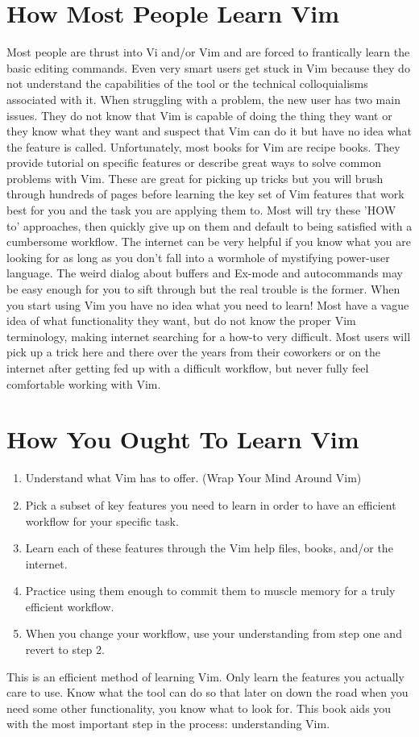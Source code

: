 \documentclass[12pt, oneside]{book}
\begin{document}
\section{How Most People Learn Vim}
Most people are thrust into Vi and/or Vim and are forced to frantically learn the basic editing commands.  Even very smart users get stuck in Vim because they do not understand the capabilities of the tool or the technical colloquialisms associated with it.  When struggling with a problem, the new user has two main issues.  They do not know that Vim is capable of doing the thing they want or they know what they want and suspect that Vim can do it but have no idea what the feature is called.  Unfortunately, most books for Vim are recipe books.  They provide tutorial on specific features or describe great ways to solve common problems with Vim.  These are great for picking up tricks but you will brush through hundreds of pages before learning the key set of Vim features that work best for you and the task you are applying them to.  Most will try these 'HOW to' approaches, then quickly give up on them and default to being satisfied with a cumbersome workflow.  The internet can be very helpful if you know what you are looking for as long as you don't fall into a wormhole of mystifying power-user language.  The weird dialog about buffers and Ex-mode and autocommands may be easy enough for you to sift through but the real trouble is the former.  When you start using Vim you have no idea what you need to learn!  Most have a vague idea of what functionality they want, but do not know the proper Vim terminology, making internet searching for a how-to very difficult.  Most users will pick up a trick here and there over the years from their coworkers or on the internet after getting fed up with a difficult workflow, but never fully feel comfortable working with Vim.

\section{How You Ought To Learn Vim}
\begin{enumerate}
\item Understand what Vim has to offer. (Wrap Your Mind Around Vim)
\item Pick a subset of key features you need to learn in order to have an efficient workflow for your specific task.
\item Learn each of these features through the Vim help files, books, and/or the internet.
\item Practice using them enough to commit them to muscle memory for a truly efficient workflow.
\item When you change your workflow, use your understanding from step one and revert to step 2.
\end{enumerate}
This is an efficient method of learning Vim.  Only learn the features you actually care to use.  Know what the tool can do so that later on down the road when you need some other functionality, you
know what to look for.  This book aids you with the most important step in the process: understanding Vim.
\end{document}
